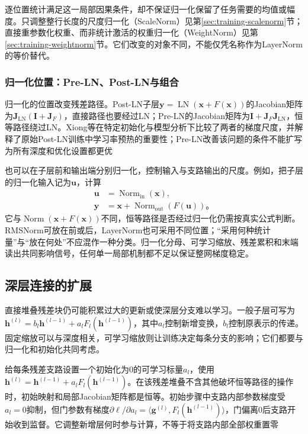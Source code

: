 逐位置统计满足这一局部因果条件，却不保证归一化保留了任务需要的均值或幅度。只调整整行长度的尺度归一化（ScaleNorm）见第\ref{sec:training-scalenorm}节；直接重参数化权重、而非统计激活的权重归一化（WeightNorm）见第\ref{sec:training-weightnorm}节。它们改变的对象不同，不能仅凭名称作为LayerNorm的等价替代。

\subsubsection{归一化位置：Pre-LN、Post-LN与组合}

归一化的位置改变残差路径。Post-LN子层$\bm y=\operatorname{LN}(\bm x+F(\bm x))$的Jacobian矩阵为$\bm J_{\mathrm{LN}}(\bm I+\bm J_F)$，直接路径也要经过LN；Pre-LN的Jacobian矩阵为$\bm I+\bm J_F\bm J_{\mathrm{LN}}$，恒等路径绕过LN。Xiong等在特定初始化与模型分析下比较了两者的梯度尺度，并解释了原始Post-LN训练中学习率预热的重要性；Pre-LN改善该问题的条件不能扩写为所有深度和优化设置都更优

也可以在子层前和输出端分别归一化，控制输入与支路输出的尺度。例如，把子层的归一化输入记为$\bm u$，计算
\begin{equation}
  \begin{aligned}
    \bm u&=\operatorname{Norm}_{\mathrm{in}}(\bm x),\\
    \bm y&=\bm x+\operatorname{Norm}_{\mathrm{out}}(F(\bm u))\text{。}
  \end{aligned}
  \label{eq:transformer-combined-normalization}
\end{equation}
它与$\operatorname{Norm}(\bm x+F(\bm x))$不同，恒等路径是否经过归一化仍需按真实公式判断。RMSNorm可放在前或后，LayerNorm也可采用不同位置；“采用何种统计量”与“放在何处”不应混作一种分类。归一化分母、可学习缩放、残差累积和末端读出共同影响信号，任何单一局部机制都不足以保证整网梯度稳定。

\subsection{深层连接的扩展}
\label{sec:transformer-deep-connections}

直接堆叠残差块仍可能积累过大的更新或使深层分支难以学习。一般子层可写为$\bm h^{(l)}=b_l\bm h^{(l-1)}+a_lF_l(\bm h^{(l-1)})$，其中$a_l$控制新增变换，$b_l$控制原表示的传递。固定缩放可以与深度相关，可学习缩放则让训练决定每条分支的影响；它们都要与归一化和初始化共同考虑。

给每条残差支路设置一个初始化为0的可学习标量$a_l$，使用$\bm h^{(l)}=\bm h^{(l-1)}+a_lF_l(\bm h^{(l-1)})$。在该残差堆叠不含其他破坏恒等路径的操作时，初始映射和局部Jacobian矩阵都是恒等。初始步骤中支路内部参数梯度受$a_l=0$抑制，但门参数有梯度$\partial\ell/\partial a_l=\langle\bm g^{(l)},F_l(\bm h^{(l-1)})\rangle$，门偏离0后支路开始收到监督。它调整新增层何时参与计算，不等于将支路内部全部权重置零

